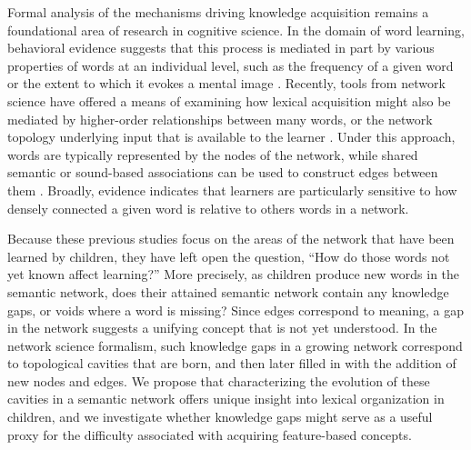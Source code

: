 \documentclass{article}
\begin{document}
Formal analysis of the mechanisms driving knowledge acquisition remains a foundational area of research in cognitive science. In the domain of word learning, behavioral evidence suggests that this process is mediated in part by various properties of words at an individual level, such as the frequency of a given word or the extent to which it evokes a mental image \cite{duff2012role,ambridge2015ubiquity}. Recently, tools from network science have offered a means of examining how lexical acquisition might also be mediated by higher-order relationships between many words, or the network topology underlying input that is available to the learner \cite{karuza2016local}. Under this approach, words are typically represented by the nodes of the network, while shared semantic or sound-based associations can be used to construct edges between them \cite{hills2009longitudinal, goldstein2014influence, steyvers2005large}. Broadly, evidence indicates that learners are particularly sensitive to how densely connected a given word is relative to others words in a network.

Because these previous studies focus on the areas of the network that have been learned by children, they have left open the question, ``How do those words not yet known affect learning?'' More precisely, as children produce new words in the semantic network, does their attained semantic network contain any knowledge gaps, or voids where a word is missing? Since edges correspond to meaning, a gap in the network suggests a unifying concept that is not yet understood. In the network science formalism, such knowledge gaps in a growing network correspond to topological cavities that are born, and then later filled in with the addition of new nodes and edges. We propose that characterizing the evolution of these cavities in a semantic network offers unique insight into lexical organization in children, and we investigate whether knowledge gaps might serve as a useful proxy for the difficulty associated with acquiring feature-based concepts.
\end{document}
